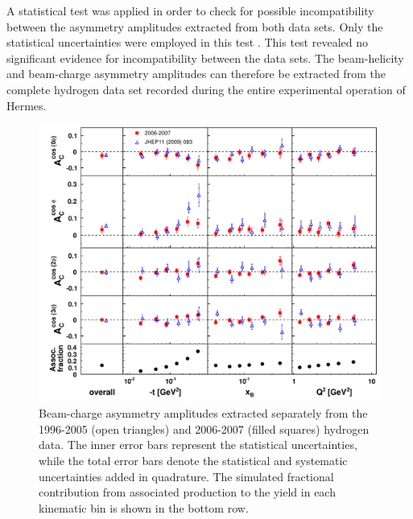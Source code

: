 A statistical test was applied in order to check for possible incompatibility between the asymmetry amplitudes extracted from both data sets. Only the statistical uncertainties were employed in this test . This test revealed no significant evidence for incompatibility between the data sets. The beam-helicity and beam-charge asymmetry amplitudes can therefore be extracted from the complete hydrogen data set recorded during the entire experimental operation of H{\sc ermes}.
\begin{figure}
\begin{center}
 \includegraphics[width=15cm,keepaspectratio]{bcaplots_eml_par13_bin6_pic_cluster_0607_9605_withassoc}
  \caption{Beam-charge asymmetry amplitudes extracted separately from the 1996-2005 (open triangles) and 2006-2007 (filled squares) hydrogen data.
The inner error bars represent the statistical uncertainties, while the total error bars denote the statistical and systematic uncertainties added in quadrature. The simulated fractional contribution from associated production to the yield in each kinematic bin is shown in the bottom row.}
 \label{release_bca_0607}
\end{center}
 \end{figure}

